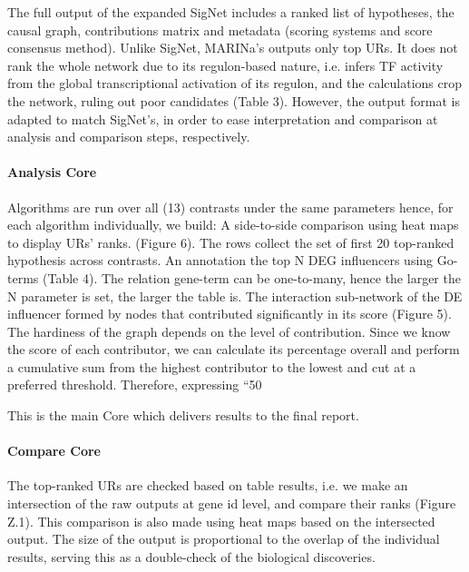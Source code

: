 The full output of the expanded SigNet includes a ranked list of hypotheses, the causal graph, contributions matrix and metadata (scoring systems and score consensus method).
Unlike SigNet, MARINa’s outputs only top URs. It does not rank the whole network due to its regulon-based nature, i.e. infers TF activity from the global transcriptional activation of its regulon, and the calculations crop the network, ruling out poor candidates (Table 3). 
However, the output format is adapted to match SigNet’s, in order to ease interpretation and comparison at analysis and comparison steps, respectively.

\paragraph{Analysis Core}
Algorithms are run over all (13) contrasts under the same parameters hence, for each algorithm individually, we build:
A side-to-side comparison using heat maps to display URs’ ranks. (Figure 6). The rows collect the set of first 20 top-ranked hypothesis across contrasts.
An annotation the top N DEG influencers using Go-terms (Table 4). The relation gene-term can be one-to-many, hence the larger the N parameter is set, the larger the table is.
The interaction sub-network of the DE influencer formed by nodes that contributed significantly in its score (Figure 5). The hardiness of the graph depends on the level of contribution. Since we know the score of each contributor, we can calculate its percentage overall and perform a cumulative sum from the highest contributor to the lowest and cut at a preferred threshold. 
Therefore, expressing “50%


This is the main Core which delivers results to the final report.

\paragraph{Compare Core}
The top-ranked URs are checked based on table results, i.e. we make an intersection of the raw outputs at gene id level, and compare their ranks (Figure Z.1). This comparison is also made using heat maps based on the intersected output.
The size of the output is proportional to the overlap of the individual results, serving this as a double-check of the biological discoveries.

